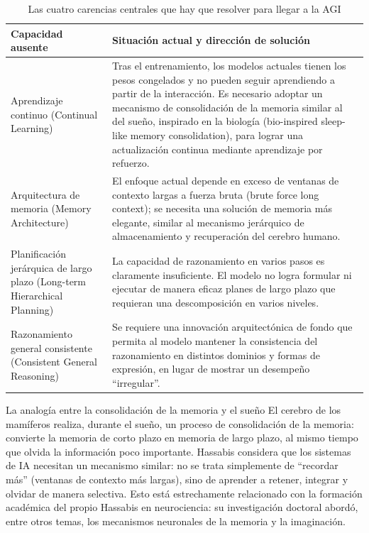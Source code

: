 \documentclass[a4paper]{article}
\begin{document}
\begin{table}[H]
\centering
\begin{tabular}{p{} p{}}
\toprule
\textbf{Capacidad ausente} & \textbf{Situación actual y dirección de solución} \\
\midrule
Aprendizaje continuo (Continual Learning) & Tras el entrenamiento, los modelos actuales tienen los pesos congelados y no pueden seguir aprendiendo a partir de la interacción. Es necesario adoptar un mecanismo de consolidación de la memoria similar al del sueño, inspirado en la biología (bio-inspired sleep-like memory consolidation), para lograr una actualización continua mediante aprendizaje por refuerzo. \\
Arquitectura de memoria (Memory Architecture) & El enfoque actual depende en exceso de ventanas de contexto largas a fuerza bruta (brute force long context); se necesita una solución de memoria más elegante, similar al mecanismo jerárquico de almacenamiento y recuperación del cerebro humano. \\
Planificación jerárquica de largo plazo (Long-term Hierarchical Planning) & La capacidad de razonamiento en varios pasos es claramente insuficiente. El modelo no logra formular ni ejecutar de manera eficaz planes de largo plazo que requieran una descomposición en varios niveles. \\
Razonamiento general consistente (Consistent General Reasoning) & Se requiere una innovación arquitectónica de fondo que permita al modelo mantener la consistencia del razonamiento en distintos dominios y formas de expresión, en lugar de mostrar un desempeño ``irregular''. \\
\bottomrule
\end{tabular}
\caption{Las cuatro carencias centrales que hay que resolver para llegar a la AGI}
\end{table}

\begin{knowledgebox}{La analogía entre la consolidación de la memoria y el sueño}
El cerebro de los mamíferos realiza, durante el sueño, un proceso de consolidación de la memoria: convierte la memoria de corto plazo en memoria de largo plazo, al mismo tiempo que olvida la información poco importante. Hassabis considera que los sistemas de IA necesitan un mecanismo similar: no se trata simplemente de ``recordar más'' (ventanas de contexto más largas), sino de aprender a retener, integrar y olvidar de manera selectiva. Esto está estrechamente relacionado con la formación académica del propio Hassabis en neurociencia: su investigación doctoral abordó, entre otros temas, los mecanismos neuronales de la memoria y la imaginación.
\end{knowledgebox}
\end{document}
